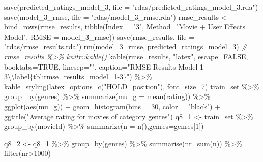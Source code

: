\documentclass[
]{article}
\newenvironment{Shaded}{}{}
\newcommand{\AttributeTok}[1]{\textcolor[rgb]{0.49,0.56,0.16}{#1}}
\newcommand{\CommentTok}[1]{\textcolor[rgb]{0.38,0.63,0.69}{\textit{#1}}}
\newcommand{\ConstantTok}[1]{\textcolor[rgb]{0.53,0.00,0.00}{#1}}
\newcommand{\DecValTok}[1]{\textcolor[rgb]{0.25,0.63,0.44}{#1}}
\newcommand{\FunctionTok}[1]{\textcolor[rgb]{0.02,0.16,0.49}{#1}}
\newcommand{\NormalTok}[1]{#1}
\newcommand{\OtherTok}[1]{\textcolor[rgb]{0.00,0.44,0.13}{#1}}
\newcommand{\SpecialCharTok}[1]{\textcolor[rgb]{0.25,0.44,0.63}{#1}}
\newcommand{\StringTok}[1]{\textcolor[rgb]{0.25,0.44,0.63}{#1}}
\begin{document}
\begin{Shaded}
\begin{Highlighting}[]
\FunctionTok{save}\NormalTok{(predicted\_ratings\_model\_3, }\AttributeTok{file =} \StringTok{"rdas/predicted\_ratings\_model\_3.rda"}\NormalTok{)}
\FunctionTok{save}\NormalTok{(model\_3\_rmse, }\AttributeTok{file =} \StringTok{"rdas/model\_3\_rmse.rda"}\NormalTok{)}
\NormalTok{rmse\_results }\OtherTok{\textless{}{-}} \FunctionTok{bind\_rows}\NormalTok{(rmse\_results,}
                          \FunctionTok{tibble}\NormalTok{(}\AttributeTok{Index =} \StringTok{"3"}\NormalTok{, }\AttributeTok{Method=}\StringTok{"Movie + User Effects Model"}\NormalTok{,  }
                                 \AttributeTok{RMSE =}\NormalTok{ model\_3\_rmse))}
\FunctionTok{save}\NormalTok{(rmse\_results, }\AttributeTok{file =} \StringTok{"rdas/rmse\_results.rda"}\NormalTok{)}
\FunctionTok{rm}\NormalTok{(model\_3\_rmse, predicted\_ratings\_model\_3)}
\CommentTok{\# rmse\_results \%\textgreater{}\% knitr::kable()}
  \FunctionTok{kable}\NormalTok{(rmse\_results, }\StringTok{"latex"}\NormalTok{, }\AttributeTok{escape=}\ConstantTok{FALSE}\NormalTok{, }\AttributeTok{booktabs=}\ConstantTok{TRUE}\NormalTok{, }\AttributeTok{linesep=}\StringTok{""}\NormalTok{, }\AttributeTok{caption=}\StringTok{"RMSE Results Model 1{-}3}\SpecialCharTok{\textbackslash{}\textbackslash{}}\StringTok{label\{tbl:rmse\_results\_model\_1{-}3\}"}\NormalTok{) }\SpecialCharTok{\%\textgreater{}\%}
    \FunctionTok{kable\_styling}\NormalTok{(}\AttributeTok{latex\_options=}\FunctionTok{c}\NormalTok{(}\StringTok{"HOLD\_position"}\NormalTok{), }\AttributeTok{font\_size=}\DecValTok{7}\NormalTok{)}
\NormalTok{train\_set }\SpecialCharTok{\%\textgreater{}\%} 
  \FunctionTok{group\_by}\NormalTok{(genres) }\SpecialCharTok{\%\textgreater{}\%} 
  \FunctionTok{summarize}\NormalTok{(}\AttributeTok{mu\_g =} \FunctionTok{mean}\NormalTok{(rating)) }\SpecialCharTok{\%\textgreater{}\%} 
  \FunctionTok{ggplot}\NormalTok{(}\FunctionTok{aes}\NormalTok{(mu\_g)) }\SpecialCharTok{+} 
  \FunctionTok{geom\_histogram}\NormalTok{(}\AttributeTok{bins =} \DecValTok{30}\NormalTok{, }\AttributeTok{color =} \StringTok{"black"}\NormalTok{) }\SpecialCharTok{+} 
  \FunctionTok{ggtitle}\NormalTok{(}\StringTok{"Average rating for movies of category genres"}\NormalTok{)}
\NormalTok{q8\_1 }\OtherTok{\textless{}{-}}\NormalTok{ train\_set }\SpecialCharTok{\%\textgreater{}\%} 
  \FunctionTok{group\_by}\NormalTok{(movieId) }\SpecialCharTok{\%\textgreater{}\%}
  \FunctionTok{summarize}\NormalTok{(}\AttributeTok{n =} \FunctionTok{n}\NormalTok{(),}\AttributeTok{genres=}\NormalTok{genres[}\DecValTok{1}\NormalTok{])}

\NormalTok{q8\_2 }\OtherTok{\textless{}{-}}\NormalTok{ q8\_1 }\SpecialCharTok{\%\textgreater{}\%} \FunctionTok{group\_by}\NormalTok{(genres) }\SpecialCharTok{\%\textgreater{}\%} 
  \FunctionTok{summarise}\NormalTok{(}\AttributeTok{nr=}\FunctionTok{sum}\NormalTok{(n)) }\SpecialCharTok{\%\textgreater{}\%} 
  \FunctionTok{filter}\NormalTok{(nr}\SpecialCharTok{\textgreater{}}\DecValTok{1000}\NormalTok{) }


\end{Highlighting}
\end{Shaded}
\end{document}
